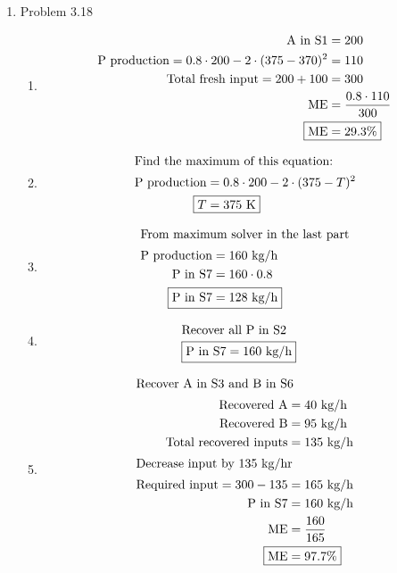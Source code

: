 \documentclass[12pt]{article}
\begin{document}
\begin{enumerate}
\newpage
    \item Problem 3.18
    \begin{enumerate}
        \item 
        \begin{align*}
            \text{A in S1} &= 200 \\
            \text{P production} = 0.8 \cdot 200 - 2 \cdot (375 - 370)^2 &= 110 \\
            \text{Total fresh input} = 200 + 100 &= 300 \\
            \mathrm{ME} &= \frac{0.8 \cdot 110}{300} \\ 
            \Aboxed{\mathrm{ME} &= 29.3 \%}
        \end{align*}
        \item 
        \begin{align*}
            \intertext{Find the maximum of this equation:} 
            \text{P production} &= 0.8 \cdot 200 - 2 \cdot (375 - T)^2 \\  
            \Aboxed{T &= 375 \text{ K}}
        \end{align*}
        \item 
        \begin{align*}
            \intertext{From maximum solver in the last part}
            \text{P production} &= 160 \text{ kg/h} \\
            \text{P in S7} &= 160 \cdot 0.8 \\ 
            \Aboxed{\text{P in S7} &= 128 \text{ kg/h}}    
        \end{align*}
        \item 
        \begin{align*}
            \intertext{Recover all P in S2}
            \Aboxed{\text{P in S7} &= 160 \text{ kg/h}}
        \end{align*}
        \item 
        \begin{align*}
            \intertext{Recover A in S3 and B in S6}
            \text{Recovered A} &= 40 \text{ kg/h} \\
            \text{Recovered B} &= 95 \text{ kg/h} \\  
            \text{Total recovered inputs} &= 135 \text{ kg/h} \\
            \intertext{Decrease input by 135 kg/hr}
            \text{Required input} = 300 - 135 &= 165 \text{ kg/h} \\
            \text{P in S7} &= 160 \text{ kg/h} \\
            \mathrm{ME} &= \frac{160}{165} \\
            \Aboxed{\mathrm{ME} &= 97.7 \%}
        \end{align*}
    \end{enumerate}


\end{enumerate}
\end{document}

